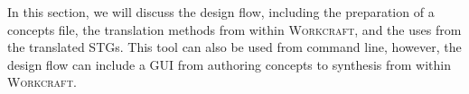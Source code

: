\documentclass[british,conference,compsoc]{IEEEtran}
\newcommand{\noun}[1]{\textsc{#1}}
\begin{document}
\vspace{-2mm}


In this section, we will discuss the design flow, including the preparation of 
a concepts file, the translation methods from within \noun{Workcraft}, and 
the uses from the translated STGs. This tool can also be used from command line,
however, the design flow can include a GUI from authoring concepts to synthesis
from within \noun{Workcraft}. 

%
%
%
%
%
%
%
%
%
%
%
%
\vspace{-3mm}
\end{document}
